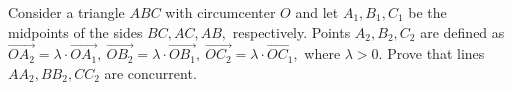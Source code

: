 Consider a triangle $ABC$ with circumcenter $O$ and let $A_1,B_1,C_1$ be the midpoints of the sides $BC,AC,AB,$ respectively.
Points $A_2,B_2,C_2$ are defined as $\overrightarrow{OA_2}=\lambda \cdot \overrightarrow{OA_1}, \ \overrightarrow{OB_2}=\lambda \cdot \overrightarrow{OB_1}, \ \overrightarrow{OC_2}=\lambda  \cdot \overrightarrow{OC_1},$ where $\lambda >0.$
Prove that lines $AA_2,BB_2,CC_2$ are concurrent.